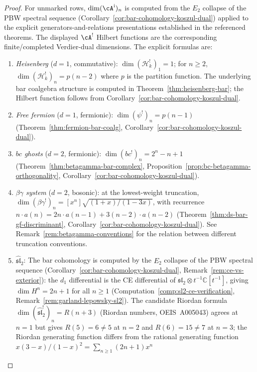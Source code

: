 \begin{proof}
For unmarked rows, $\dim(\cA^{\mathrm i})_n$ is computed from the
$E_2$ collapse of the PBW spectral sequence
(Corollary~\ref{cor:bar-cohomology-koszul-dual}) applied to the explicit
generators-and-relations presentations established in the referenced
theorems.  The displayed $\cA^!$ Hilbert functions are the corresponding
finite/completed Verdier-dual dimensions.
The explicit formulas are:
\begin{enumerate}
\item \emph{Heisenberg} ($d = 1$, commutative):
 $\dim (\mathcal{H}_k^!)_1 = 1$; for $n \geq 2$,
 $\dim (\mathcal{H}_k^!)_n = p(n-2)$ where $p$ is the partition function.
 The underlying bar coalgebra structure is computed in
 Theorem~\ref{thm:heisenberg-bar}; the Hilbert function follows
 from Corollary~\ref{cor:bar-cohomology-koszul-dual}.
\item \emph{Free fermion} ($d = 1$, fermionic):
 $\dim (\psi^!)_n = p(n-1)$
 (Theorem~\ref{thm:fermion-bar-coalg},
 Corollary~\ref{cor:bar-cohomology-koszul-dual}).
\item \emph{$bc$ ghosts} ($d = 2$, fermionic):
 $\dim (bc^!)_n = 2^n - n + 1$
 (Theorem~\ref{thm:betagamma-bar-complex},
 Proposition~\ref{prop:bc-betagamma-orthogonality},
 Corollary~\ref{cor:bar-cohomology-koszul-dual}).
\item \emph{$\beta\gamma$ system} ($d = 2$, bosonic):
 at the lowest-weight truncation,
 $\dim (\beta\gamma^!)_n = [x^n]\sqrt{(1{+}x)/(1{-}3x)}$,
 with recurrence $n \cdot a(n) = 2n \cdot a(n{-}1) + 3(n{-}2) \cdot a(n{-}2)$
 (Theorem~\ref{thm:ds-bar-gf-discriminant},
 Corollary~\ref{cor:bar-cohomology-koszul-dual}).
 See Remark~\ref{rem:betagamma-conventions}
 for the relation between different truncation conventions.
\item \emph{$\widehat{\mathfrak{sl}}_2$}:
 The bar cohomology is computed by the $E_2$ collapse
 of the PBW spectral sequence
 (Corollary~\ref{cor:bar-cohomology-koszul-dual},
 Remark~\ref{rem:ce-vs-exterior}): the $d_1$
 differential is the CE differential of
 $\mathfrak{sl}_2 \otimes t^{-1}\mathbb{C}[t^{-1}]$,
 giving $\dim H^n = 2n+1$ for all $n \geq 1$
 (Computation~\ref{comp:sl2-ce-verification},
 Remark~\ref{rem:garland-lepowsky-sl2}).
 The candidate Riordan formula
 $\dim (\widehat{\mathfrak{sl}}_2^!)_n = R(n+3)$
 (Riordan numbers, OEIS~A005043) agrees at $n = 1$
 but gives $R(5) = 6 \neq 5$ at $n = 2$ and
 $R(6) = 15 \neq 7$ at $n = 3$; the Riordan generating
 function differs from the rational generating function
 $x(3-x)/(1-x)^2 = \sum_{n \geq 1}(2n+1)x^n$

\end{enumerate}
\end{proof}
